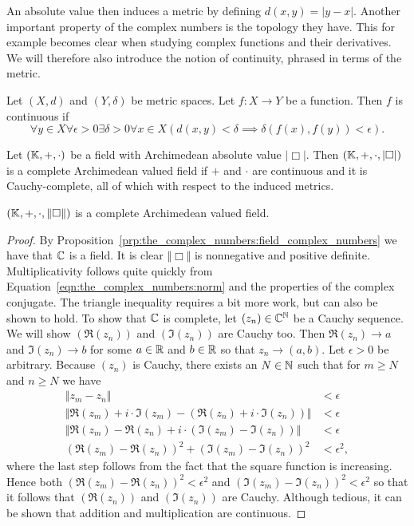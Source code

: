 \documentclass[../main.tex]{subfiles}
\begin{document}
An absolute value then induces a metric by defining $d(x,y)=\vert y-x\vert$. Another important property of the complex numbers is the topology they have. This for example becomes clear when studying complex functions and their derivatives. We will therefore also introduce the notion of continuity, phrased in terms of the metric.
\begin{definition}
    Let $(X,d)$ and $(Y,\delta)$ be metric spaces. Let $f:X\to Y$ be a function. Then $f$ is continuous if
    \begin{equation*}
        \forall y\in X\forall\epsilon>0\exists\delta>0\forall x\in X(d(x,y)<\delta\implies\delta(f(x),f(y))<\epsilon).
    \end{equation*}
\end{definition}
\begin{definition}
    Let $(\mathbb{K},+,\cdot)$ be a field with Archimedean absolute value $\vert\Box\vert$. Then $(\mathbb{K},+,\cdot,\vert\Box\vert)$ is a complete Archimedean valued field if $+$ and $\cdot$ are continuous and it is Cauchy-complete, all of which with respect to the induced metrics.
\end{definition}
\begin{proposition}
    $(\mathbb{K},+,\cdot,\Vert\Box\Vert)$ is a complete Archimedean valued field.
\end{proposition}
\begin{proof}
    By Proposition~\ref{prp:the_complex_numbers:field_complex_numbers} we have that $\mathbb{C}$ is a field. It is clear $\Vert\Box\Vert$ is nonnegative and positive definite. Multiplicativity follows quite quickly from Equation~\eqref{eqn:the_complex_numbers:norm} and the properties of the complex conjugate. The triangle inequality requires a bit more work, but can also be shown to hold. To show that $\mathbb{C}$ is complete, let $(z_n)\in\mathbb{C}^{\mathbb{N}}$ be a Cauchy sequence. We will show $(\Re(z_n))$ and $(\Im(z_n))$ are Cauchy too. Then $\Re(z_n)\to a$ and $\Im(z_n)\to b$ for some $a\in\mathbb{R}$ and $b\in\mathbb{R}$ so that $z_n\to(a,b)$. Let $\epsilon>0$ be arbitrary. Because $(z_n)$ is Cauchy, there exists an $N\in\mathbb{N}$ such that for $m\geq N$ and $n\geq N$ we have
    \begin{align*}
        \Vert z_m-z_n\Vert & <\epsilon \\
        \Vert\Re(z_m)+i\cdot\Im(z_m)-(\Re(z_n)+i\cdot\Im(z_n))\Vert & <\epsilon \\
        \Vert\Re(z_m)-\Re(z_n)+i\cdot(\Im(z_m)-\Im(z_n))\Vert & <\epsilon \\
        (\Re(z_m)-\Re(z_n))^2+(\Im(z_m)-\Im(z_n))^2 & <\epsilon^2,
    \end{align*}
    where the last step follows from the fact that the square function is increasing. Hence both $(\Re(z_m)-\Re(z_n))^2<\epsilon^2$ and $(\Im(z_m)-\Im(z_n))^2<\epsilon^2$ so that it follows that $(\Re(z_n))$ and $(\Im(z_n))$ are Cauchy. Although tedious, it can be shown that addition and multiplication are continuous.
\end{proof}
\end{document}
